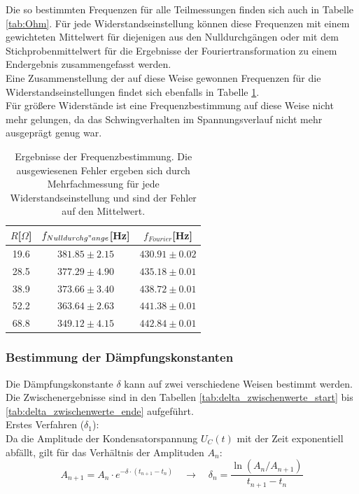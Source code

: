 \documentclass[12pt,a4paper]{article}
\begin{document}
Die so bestimmten Frequenzen für alle Teilmessungen finden sich auch in Tabelle \ref{tab:Ohm}.
Für jede Widerstandseinstellung können diese Frequenzen mit einem gewichteten Mittelwert für diejenigen aus den Nulldurchgängen oder mit dem Stichprobenmittelwert für die Ergebnisse der Fouriertransformation zu einem Endergebnis zusammengefasst werden.\\
Eine Zusammenstellung der auf diese Weise gewonnen Frequenzen für die Widerstandseinstellungen findet sich ebenfalls in Tabelle \ref{tab:Frequenzen}.\\
Für größere Widerstände ist eine Frequenzbestimmung auf diese Weise nicht mehr gelungen, da das Schwingverhalten im Spannungsverlauf nicht mehr ausgeprägt genug war.

\begin{table}
\caption{Ergebnisse der Frequenzbestimmung. Die ausgewiesenen Fehler ergeben sich durch Mehrfachmessung für jede Widerstandseinstellung und sind der Fehler auf den Mittelwert.}
\begin{center}
\begin{tabular}{|c|c|c|}
\hline
$R$[$\Omega$] & $f_{Nulldurchg"ange}$[Hz] & $f_{Fourier}$[Hz] \\
\hline
 19.6 & $381.85 \pm 2.15$ & $430.91 \pm 0.02$\\
\hline
 28.5 & $377.29 \pm 4.90$ & $435.18 \pm 0.01$\\
\hline
 38.9 & $373.66 \pm 3.40$ & $438.72 \pm 0.01$\\
\hline
 52.2 & $363.64 \pm 2.63$ & $441.38 \pm 0.01$\\
\hline
 68.8 & $349.12 \pm 4.15$ & $442.84 \pm 0.01$\\
\hline
\end{tabular}
\end{center}
\label{tab:Frequenzen}
\end{table}



\subsubsection{Bestimmung der Dämpfungskonstanten}
Die Dämpfungskonstante $\delta$ kann auf zwei verschiedene Weisen bestimmt werden. Die Zwischenergebnisse sind in den Tabellen \ref{tab:delta_zwischenwerte_start} bis \ref{tab:delta_zwischenwerte_ende} aufgeführt.\\

Erstes Verfahren ($\delta_1$):\\
Da die Amplitude der Kondensatorspannung $U_C(t)$ mit der Zeit exponentiell abfällt, gilt für das Verhältnis der Amplituden $A_n$:
\begin{equation}
A_{n+1} = A_n \cdot e^{-\delta \cdot (t_{n+1} - t_n)} \quad \rightarrow \quad \delta_n = \frac{\ln ( A_n / A_{n+1})}{t_{n+1}-t_n}
\end{equation}
\end{document}
